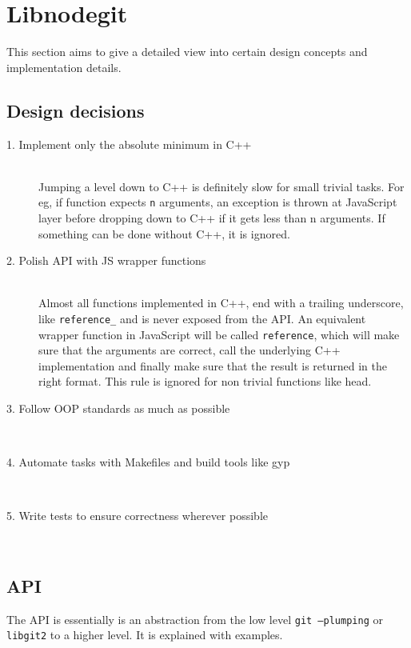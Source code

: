 \chapter{Libnodegit}

This section aims to give a detailed view into certain design concepts and
implementation details.

\section{Design decisions}

\begin{description}

\item[1. Implement only the absolute minimum in C++] \hfill \\
  Jumping a level down to C++ is definitely slow for small trivial tasks. For
  eg, if function expects \texttt{n} arguments, an exception is thrown at
  JavaScript layer before dropping down to C++ if it gets less than n arguments.
  If something can be done without C++, it is ignored.

\item[2. Polish API with JS wrapper functions] \hfill \\
  Almost all functions implemented in C++, end with a trailing underscore, like
  \texttt{reference\_} and is never exposed from the API. An equivalent wrapper
  function in JavaScript will be called \texttt{reference}, which will make sure
  that the arguments are correct, call the underlying C++ implementation and
  finally make sure that the result is returned in the right format. This rule
  is ignored for non trivial functions like head.

\item[3. Follow OOP standards as much as possible] \hfill \\
\item[4. Automate tasks with Makefiles and build tools like gyp] \hfill \\
\item[5. Write tests to ensure correctness wherever possible] \hfill \\

\end{description}

\section{API}

The API is essentially is an abstraction from the low level \texttt{git
  --plumping} or \texttt{libgit2} to a higher level. It is explained with
examples.

